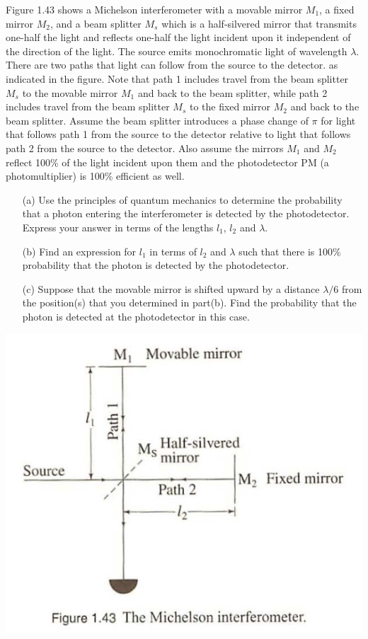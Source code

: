 \documentclass[12pt,letterpaper,boxed,cm]{hmcpset}
\begin{document}
\begin{problem}[Townsend 1.27]
Figure 1.43 shows a Michelson interferometer with a movable mirror $M_1$, a fixed mirror $M_2$, and a beam splitter $M_s$ which is a half-silvered mirror that transmits one-half the light and reflects one-half the light incident upon it independent of the direction of the light. The source emits monochromatic light of wavelength $\lambda$. There are two paths that light can follow from the source to the detector. as indicated in the figure. Note that path 1 includes travel from the beam splitter $M_s$ to the movable mirror $M_1$ and back to the beam splitter, while path 2 includes travel from the beam splitter $M_s$ to the fixed mirror $M_2$ and back to the beam splitter. Assume the beam splitter introduces a phase change of $\pi$ for light that follows path 1 from the source to the detector relative to light that follows path 2 from the source to the detector. Also assume the mirrors $M_1$ and $M_2$ reflect 100\% of the light incident upon them and the photodetector PM (a photomultiplier) is 100\% efficient as well. 
\begin{enumerate}
	\item[(a)] Use the principles of quantum mechanics to determine the probability that a photon entering the interferometer is detected by the photodetector. Express your answer in terms of the lengths $l_1$, $l_2$ and $\lambda$. 
	\item[(b)] Find an expression for $l_1$ in terms of $l_2$ and $\lambda$ such that there is 100\% probability that the photon is detected by the photodetector. 
	\item[(c)] Suppose that the movable mirror is shifted upward by a distance $\lambda/6$ from the position(s) that you determined in part(b). Find the probability that the photon is detected at the photodetector in this case.
\end{enumerate}
\begin{center}
	\includegraphics[scale=0.6]{pic1.png}
\end{center}
\end{problem}
\begin{solution}
\end{solution}
\newpage
\end{document}
